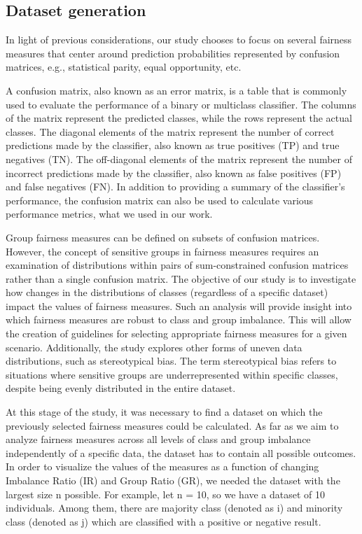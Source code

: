 \documentclass[sn-vancouver]{sn-jnl}%
\theoremstyle{thmstyleone}%
\theoremstyle{thmstyletwo}%
\theoremstyle{thmstylethree}%
\begin{document}
\subsection{Dataset generation}\label{subsec2}

In light of previous considerations, our study chooses to focus on several fairness measures that center around prediction probabilities represented by confusion matrices, e.g., statistical parity, equal opportunity, etc.

A confusion matrix, also known as an error matrix, is a table that is commonly used to evaluate the performance of a binary or multiclass classifier. The columns of the matrix represent the predicted classes, while the rows represent the actual classes. The diagonal elements of the matrix represent the number of correct predictions made by the classifier, also known as true positives (TP) and true negatives (TN). The off-diagonal elements of the matrix represent the number of incorrect predictions made by the classifier, also known as false positives (FP) and false negatives (FN). In addition to providing a summary of the classifier's performance, the confusion matrix can also be used to calculate various performance metrics, what we used in our work. 

Group fairness measures can be defined on subsets of confusion matrices. However, the concept of sensitive groups in fairness measures requires an examination of distributions within pairs of sum-constrained confusion matrices rather than a single confusion matrix. The objective of our study is to investigate how changes in the distributions of classes (regardless of a specific dataset) impact the values of fairness measures. Such an analysis will provide insight into which fairness measures are robust to class and group imbalance. This will allow the creation of guidelines for selecting appropriate fairness measures for a given scenario. Additionally, the study explores other forms of uneven data distributions, such as stereotypical bias. The term stereotypical bias refers to situations where sensitive groups are underrepresented within specific classes, despite being evenly distributed in the entire dataset.

At this stage of the study, it was necessary to find a dataset on which the previously selected fairness measures could be calculated. As far as we aim to analyze fairness measures across all levels of class and group imbalance independently of a specific data, the dataset has to contain all possible outcomes. In order to visualize the values of the measures as a function of changing Imbalance Ratio (IR) and Group Ratio (GR), we needed the dataset with the largest size n possible. For example, let n = 10, so we have a dataset of 10 individuals. Among them, there are majority class (denoted as i) and minority class (denoted as j) which are classified with a positive or negative result. 
\end{document}
